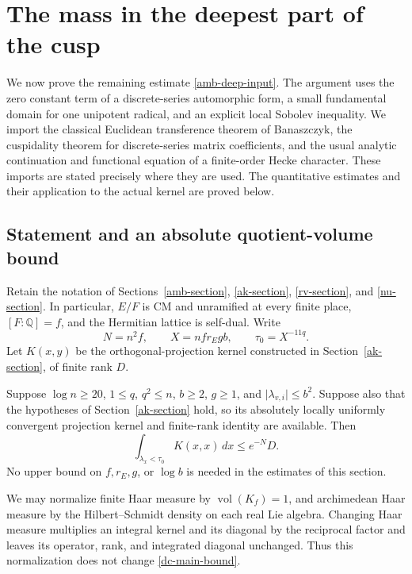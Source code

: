 \section{The mass in the deepest part of the cusp}
\label{dc-section}

We now prove the remaining estimate \eqref{amb-deep-input}.
The argument uses the zero constant term of a discrete-series
automorphic form, a small fundamental domain for one unipotent
radical, and an explicit local Sobolev inequality.  We import
the classical Euclidean transference theorem of Banaszczyk,
the cuspidality theorem for discrete-series matrix coefficients,
and the usual analytic continuation and functional equation
of a finite-order Hecke character.  These imports are stated
precisely where they are used.  The quantitative estimates
and their application to the actual kernel are proved below.

\subsection{Statement and an absolute quotient-volume bound}

Retain the notation of Sections~\ref{amb-section},
\ref{ak-section}, \ref{rv-section}, and \ref{nu-section}.
In particular, \(E/F\) is CM and unramified at every finite
place, \([F:\mathbb Q]=f\), and the Hermitian lattice is
self-dual.  Write
\[
 N=n^2f,\qquad X=nfr_Egb,\qquad \tau_0=X^{-11q}.
\]
Let \(K(x,y)\) be the orthogonal-projection kernel constructed
in Section~\ref{ak-section}, of finite rank \(D\).

\begin{theorem}\label{dc-main}
Suppose \(\log n\ge20\), \(1\le q\), \(q^2\le n\),
\(b\ge2\), \(g\ge1\), and
\(\lvert\lambda_{v,i}\rvert\le b^2\).
Suppose also that the hypotheses of
Section~\ref{ak-section} hold, so its absolutely locally
uniformly convergent projection kernel and finite-rank
identity are available.  Then
\begin{equation}\label{dc-main-bound}
        \int_{\lambda_x<\tau_0}K(x,x)\,dx
                                    \le e^{-N}D.
\end{equation}
No upper bound on \(f,r_E,g\), or \(\log b\) is needed
in the estimates of this section.
\end{theorem}

We may normalize finite Haar measure by
\(\operatorname{vol}(K_f)=1\), and archimedean Haar measure
by the Hilbert--Schmidt density on each real Lie algebra.
Changing Haar measure multiplies an integral kernel and
its diagonal by the reciprocal factor and leaves its
operator, rank, and integrated diagonal unchanged.
Thus this normalization does not change
\eqref{dc-main-bound}.

